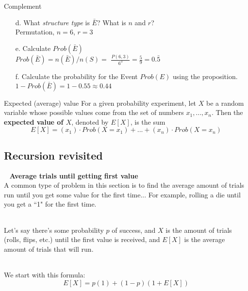 {\begin{intro}{Complement}
\begin{enumerate}
                \item[d.] What \textit{structure type} is $\bar{E}$? What is $n$ and $r$? \\
                    Permutation, $n = 6$, $r = 3$

                \item[e.] Calculate $Prob(\bar{E})$ \\
                    $Prob(\bar{E}) = n(\bar{E}) / n(S) =$
                    $\frac{P(6,3)}{6^{3}} = \frac{5}{9} = 0.\bar{5}$

                \item[f.] Calculate the probability for the Event $Prob(E)$ using the proposition. \\
                    $1 - Prob(\bar{E}) = 1 - 0.55 \approx 0.44$
            \end{enumerate}
        \end{intro}

        \begin{intro}{Expected (average) value}
            \footnotesize
            For a given probability experiment, let $X$ be a random
            variable whose possible values come from the set of numbers
            $ x_{1}, ..., x_{n} $. Then the \textbf{expected value of $X$},
            denoted by $E[X]$, is the sum
            $$ E[X] = (x_{1}) \cdot Prob(X = x_{1}) + ... + (x_{n}) \cdot Prob(X = x_{n}) $$
        \end{intro}


    \subsection{Recursion revisited}
        \begin{intro}{\ }
            \textbf{Average trials until getting first value} \\
            A common type of problem in this section is to find the
            average amount of trials run until you get some value for
            the first time... For example, rolling a die until you
            get a ``1" for the first time.

            ~\\
            Let's say there's some probability $p$ of success, and $X$
            is the amount of trials (rolls, flips, etc.) until the first
            value is received, and $E[X]$ is the average amount of
            trials that will run.

            ~\\
            We start with this formula:
            $$ E[X] = p(1) + (1 - p)(1 + E[X]) $$


\end{intro}}
